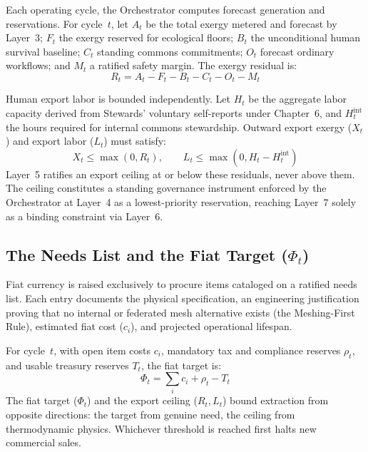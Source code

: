Each operating cycle, the Orchestrator computes forecast generation and reservations. For cycle~$t$, let $A_t$ be the total exergy metered and forecast by Layer~3; $F_t$ the exergy reserved for ecological floors; $B_t$ the unconditional human survival baseline; $C_t$ standing commons commitments; $O_t$ forecast ordinary workflows; and $M_t$ a ratified safety margin. The exergy residual is:
\begin{equation}
  R_t = A_t - F_t - B_t - C_t - O_t - M_t
  \label{eq:exergy_residual}
\end{equation}

Human export labor is bounded independently. Let $H_t$ be the aggregate labor capacity derived from Stewards' voluntary self-reports under Chapter~6, and $H^{\mathrm{int}}_t$ the hours required for internal commons stewardship. Outward export exergy ($X_t$) and export labor ($L_t$) must satisfy:
\begin{equation}
  X_t \le \max(0, R_t), \qquad L_t \le \max(0, H_t - H^{\mathrm{int}}_t)
  \label{eq:export_bounds}
\end{equation}
Layer~5 ratifies an export ceiling at or below these residuals, never above them. The ceiling constitutes a standing governance instrument enforced by the Orchestrator at Layer~4 as a lowest-priority reservation, reaching Layer~7 solely as a binding constraint via Layer~6.

\subsection{\texorpdfstring{The Needs List and the Fiat Target ($\Phi_t$)}{The Needs List and the Fiat Target (Phi)}}

Fiat currency is raised exclusively to procure items cataloged on a ratified needs list. Each entry documents the physical specification, an engineering justification proving that no internal or federated mesh alternative exists (the Meshing-First Rule), estimated fiat cost ($c_i$), and projected operational lifespan.

For cycle~$t$, with open item costs $c_i$, mandatory tax and compliance reserves $\rho_t$, and usable treasury reserves $T_t$, the fiat target is:
\begin{equation}
  \Phi_t = \sum_i c_i + \rho_t - T_t
  \label{eq:fiat_target}
\end{equation}
The fiat target ($\Phi_t$) and the export ceiling ($R_t, L_t$) bound extraction from opposite directions: the target from genuine need, the ceiling from thermodynamic physics. Whichever threshold is reached first halts new commercial sales.

